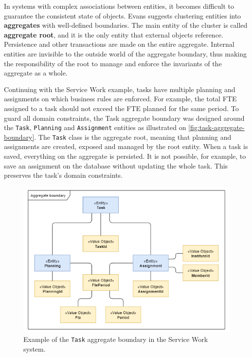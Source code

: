 In systems with complex associations between entities, it becomes difficult to guarantee the consistent state of objects. Evans \cite{ddd-blue-book} \cite{ddd-reference} suggests clustering entities into \textbf{aggregates} with well-defined boundaries. The main entity of the cluster is called \textbf{aggregate root}, and it is the only entity that external objects reference. Persistence and other transactions are made on the entire aggregate. Internal entities are invisible to the outside world of the aggregate boundary, thus making the responsibility of the root to manage and enforce the invariants of the aggregate as a whole.

Continuing with the Service Work example, tasks have multiple planning and assignments on which business rules are enforced. For example, the total FTE assigned to a task should not exceed the FTE planned for the same period. To guard all domain constraints, the Task aggregate boundary was designed around the \texttt{Task}, \texttt{Planning} and \texttt{Assignment} entities as illustrated on \autoref{fig:task-aggregate-boundary}. The \texttt{Task} class is the aggregate root, meaning that planning and assignments are created, exposed and managed by the root entity. When a task is saved, everything on the aggregate is persisted. It is not possible, for example, to save an assignment on the database without updating the whole task. This preserves the task's domain constraints. 

\begin{figure}[htbp]
  \centering
  \includegraphics[scale=0.67]{Imagens/chap04/task-aggregate-boundary.png}
  \caption{Example of the \texttt{Task} aggregate boundary in the Service Work system.}
  \label{fig:task-aggregate-boundary}
\end{figure}

